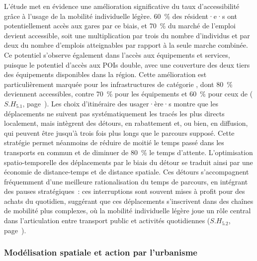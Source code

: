\begin{refsegment}
L’étude met en évidence une amélioration significative du taux d’accessibilité grâce à l’usage de la mobilité individuelle légère. 60~\% des résident·e·s ont potentiellement accès aux gares par ce biais, et 70~\% du marché de l’emploi devient accessible, soit une multiplication par trois du nombre d’individus et par deux du nombre d’emplois atteignables par rapport à la seule marche combinée. Ce potentiel s’observe également dans l’accès aux équipements et services, puisque le potentiel d’accès aux \acrfull{POIs} double, avec une couverture des deux tiers des équipements disponibles dans la région. Cette amélioration est particulièrement marquée pour les infrastructures de catégorie , dont 80~\% deviennent accessibles, contre 70~\% pour les équipements  et 60~\% pour ceux de  (\hyperref[sous-hypothese-5.1]{\(S.H_{5.1}\)}, page~\pageref{sous-hypothese-5.1}). Les choix d’\gls{itinéraire} des usager·ère·s montre que les déplacements ne suivent pas systématiquement les tracés les plus directs localement, mais intègrent des détours, en rabattement et, ou bien, en diffusion, qui peuvent être jusqu’à trois fois plus longs que le parcours supposé. Cette stratégie permet néanmoins de réduire de moitié le temps passé dans les transports en commun et de diminuer de 80~\% le temps d’attente. L’optimisation spatio-temporelle des déplacements par le biais du \gls{détour} se traduit ainsi par une économie de distance-temps et de distance spatiale. Ces détours s’accompagnent fréquemment d’une meilleure rationalisation du temps de parcours, en intégrant des pauses stratégiques~: ces interruptions sont souvent mises à profit pour des achats du quotidien, suggérant que ces déplacements s’inscrivent dans des chaînes de mobilité plus complexes, où la mobilité individuelle légère joue un rôle central dans l’articulation entre transport public et activités quotidiennes (\hyperref[sous-hypothese-5.2]{\(S.H_{5.2}\)}, page~\pageref{sous-hypothese-5.2}).%

\subsubsection*{Modélisation spatiale et action par l'urbanisme
    \label{conclusion-generale:principaux-apports-chapitre6}
    }


\end{refsegment}
